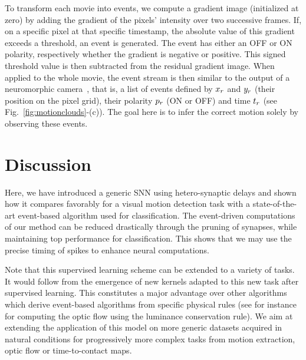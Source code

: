 \documentclass[default]{sn-jnl}%
\theoremstyle{thmstyleone}%
\theoremstyle{thmstyletwo}%
\theoremstyle{thmstylethree}%
\newcommand{\seeFig}[1]{see Fig.~\ref{fig:#1}}%
\begin{document}
To transform each movie into events, we compute a gradient image (initialized at zero) by adding the gradient of the pixels' intensity over two successive frames. If, on a specific pixel at that specific timestamp, the absolute value of this gradient exceeds a threshold, an event is generated. The event has either an OFF or ON polarity, respectively whether the gradient is negative or positive. This signed threshold value is then subtracted from the residual gradient image. When applied to the whole movie, the event stream is then similar to the output of a neuromorphic camera~\citep{rasetto_challenges_2022}, that is, a list of events defined by $x_r$ and $y_r$ (their position on the pixel grid), their polarity $p_r$ (ON or OFF) and time $t_r$  (\seeFig{motionclouds}-(c)). The goal here is to infer the correct motion solely by observing these events.


\section{Discussion}

Here, we have introduced a generic SNN using hetero-synaptic delays and shown how it compares favorably for a visual motion detection task with a state-of-the-art event-based algorithm used for classification. The event-driven computations of our method can be reduced drastically through the pruning of synapses, while maintaining top performance for classification. This shows that we may use the precise timing of spikes to enhance neural computations. 


Note that this supervised learning scheme can be extended to a variety of tasks. It would follow from the emergence of new kernels adapted to this new task after supervised learning.  This constitutes a major advantage over other algorithms which derive event-based algorithms from specific physical rules (see for instance~\citep{benosman_asynchronous_2012} for computing the optic flow using the luminance conservation rule). We aim at extending the application of this model on more generic datasets acquired in natural conditions for progressively more complex tasks from motion extraction, optic flow or time-to-contact maps.
%
\end{document}
